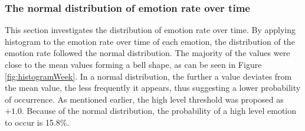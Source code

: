 \subsubsection{The normal distribution of emotion rate over time}
This section investigates the distribution of emotion rate over time. By applying histogram to the emotion rate over time of each emotion, the distribution of the emotion rate followed the normal distribution. The majority of the values were close to the mean values forming a bell shape, as can be seen in Figure \ref{fig:histogramWeek}. In a normal distribution, the further a value deviates from the mean value, the less frequently it appears, thus suggesting a lower probability of occurrence. As mentioned earlier, the high level threshold was proposed as \(+1.0\). Because of the normal distribution, the probability of a high level emotion to occur is 15.8\%.

